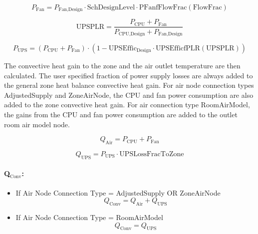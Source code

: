 \begin{equation}
P_{\textrm{Fan}} = P_{\textrm{Fan,Design}} \cdot \textrm{SchDesignLevel} \cdot \textrm{PFanfFlowFrac}(\textrm{FlowFrac})
\end{equation}

\begin{equation}
\textrm{UPSPLR} = \frac{P_{\textrm{CPU}} + P_{\textrm{Fan}}}{P_{\textrm{CPU,Design}} + P_{\textrm{Fan,Design}}}
\end{equation}

\begin{equation}
P_{\textrm{UPS}} = (P_{\textrm{CPU}} + P_{\textrm{Fan}}) \cdot (1 - \textrm{UPSEffic}_{\textrm{Design}} \cdot \textrm{UPSEfficfPLR}(\textrm{UPSPLR}))
\end{equation}

The convective heat gain to the zone and the air outlet temperature are then calculated. The user specified fraction of power supply losses are always added to the general zone heat balance convective heat gain. For air node connection types AdjustedSupply and ZoneAirNode, the CPU and fan power consumption are also added to the zone convective heat gain. For air connection type RoomAirModel, the gains from the CPU and fan power consumption are added to the outlet room air model node.

\begin{equation}
Q_{\textrm{Air}} = P_{\textrm{CPU}} + P_{\textrm{Fan}}
\end{equation}

\begin{equation}
Q_{\textrm{UPS}} = P_{\textrm{UPS}} \cdot \textrm{UPSLossFracToZone}
\end{equation}

\paragraph{Q$_\textrm{Conv}$:}

\begin{itemize}
    \tightlist
  \item
    If Air Node Connection Type = AdjustedSupply OR ZoneAirNode
\begin{equation}
Q_{\textrm{Conv}} = Q_{\textrm{Air}} + Q_{\textrm{UPS}}
\end{equation}
  \item
    If Air Node Connection Type = RoomAirModel
\begin{equation}
Q_{\textrm{Conv}} = Q_{\textrm{UPS}}
\end{equation}
\end{itemize}

